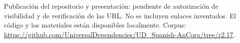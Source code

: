 Publicación del repositorio y presentación: pendiente de autorización
de visibilidad y de verificación de las URL. No se incluyen enlaces
inventados. El código y los materiales están disponibles localmente.
Corpus: \url{https://github.com/UniversalDependencies/UD_Spanish-AnCora/tree/r2.17}.
